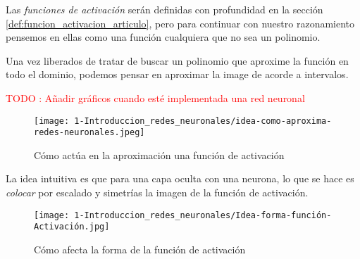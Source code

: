 \label{ch03:funcionamiento-intuitivo-funcion-activacion}

Las \textit{funciones de activación} serán definidas con profundidad en la sección 
\ref{def:funcion_activacion_articulo}, pero para continuar con nuestro razonamiento 
pensemos en ellas como una función cualquiera que no sea un polinomio. 

Una vez liberados de tratar de buscar un polinomio que aproxime la función en todo
el dominio, podemos pensar en aproximar la image de acorde a intervalos.  
 
\textcolor{red}{TODO : Añadir gráficos cuando esté implementada una red neuronal}

\begin{figure}[h!]
    \texttt{[image: 1-Introduccion\_redes\_neuronales/idea-como-aproxima-redes-neuronales.jpeg]}
    \caption{Cómo actúa en la aproximación una función de activación}
    \label{img:idea-como-aproxima-redes-neuronales}
   \end{figure}

La idea intuitiva es que para una capa oculta con una neurona, 
lo que se hace es \textit{colocar} por escalado y simetrías la imagen de la función de activación. 

\begin{figure}[h!]
    \texttt{[image: 1-Introduccion\_redes\_neuronales/Idea-forma-función-Activación.jpg]}
    \caption{Cómo afecta la forma de la función de activación}
    \label{img:como afecta la forma de la función de aproximación}
\end{figure}
